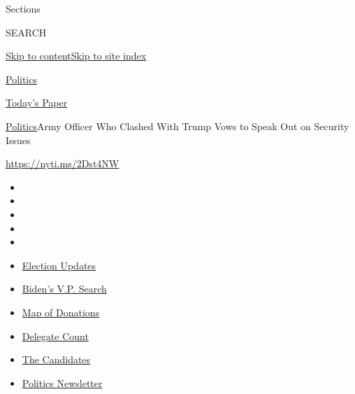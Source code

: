 Sections

SEARCH

\protect\hyperlink{site-content}{Skip to
content}\protect\hyperlink{site-index}{Skip to site index}

\href{https://www.nytimes.com/section/politics}{Politics}

\href{https://myaccount.nytimes.com/auth/login?response_type=cookie\&client_id=vi}{}

\href{https://www.nytimes.com/section/todayspaper}{Today's Paper}

\href{/section/politics}{Politics}\textbar{}Army Officer Who Clashed
With Trump Vows to Speak Out on Security Issues

\url{https://nyti.ms/2Dst4NW}

\begin{itemize}
\item
\item
\item
\item
\item
\end{itemize}

\begin{itemize}
\item
  \href{https://www.nytimes.com/2020/07/31/us/elections/biden-vs-trump.html?action=click\&pgtype=Article\&state=default\&region=TOP_BANNER\&context=storylines_menu}{Election
  Updates}
\item
  \href{https://www.nytimes.com/article/biden-vice-president-2020.html?action=click\&pgtype=Article\&state=default\&region=TOP_BANNER\&context=storylines_menu}{Biden's
  V.P. Search}
\item
  \href{https://www.nytimes.com/interactive/2020/07/24/us/politics/trump-biden-campaign-donors.html?action=click\&pgtype=Article\&state=default\&region=TOP_BANNER\&context=storylines_menu}{Map
  of Donations}
\item
  \href{https://www.nytimes.com/interactive/2020/us/elections/delegate-count-primary-results.html?action=click\&pgtype=Article\&state=default\&region=TOP_BANNER\&context=storylines_menu}{Delegate
  Count}
\item
  \href{https://www.nytimes.com/interactive/2019/us/politics/2020-presidential-candidates.html?action=click\&pgtype=Article\&state=default\&region=TOP_BANNER\&context=storylines_menu}{The
  Candidates}
\item
  \href{https://www.nytimes.com/newsletters/politics?action=click\&pgtype=Article\&state=default\&region=TOP_BANNER\&context=storylines_menu}{Politics
  Newsletter}
\end{itemize}

